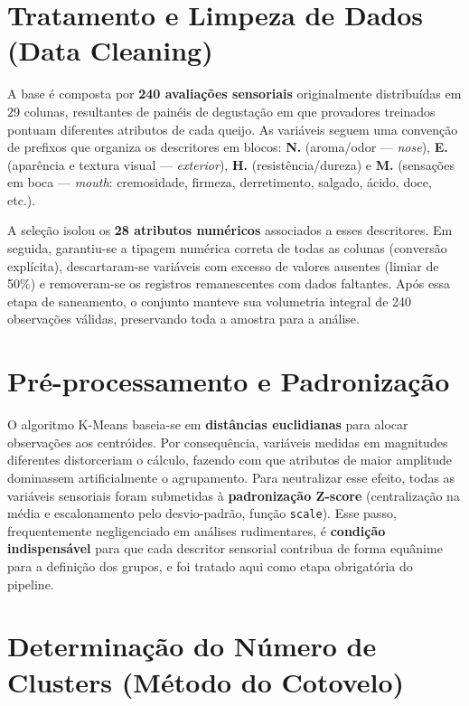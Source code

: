 \documentclass[11pt,a4paper]{article}
\begin{document}
\section{Tratamento e Limpeza de Dados (Data Cleaning)}

A base é composta por \textbf{240 avaliações sensoriais} originalmente distribuídas em 29 colunas, resultantes de painéis de degustação em que provadores treinados pontuam diferentes atributos de cada queijo. As variáveis seguem uma convenção de prefixos que organiza os descritores em blocos: \textbf{N.} (aroma/odor --- \textit{nose}), \textbf{E.} (aparência e textura visual --- \textit{exterior}), \textbf{H.} (resistência/dureza) e \textbf{M.} (sensações em boca --- \textit{mouth}: cremosidade, firmeza, derretimento, salgado, ácido, doce, etc.).

A seleção isolou os \textbf{28 atributos numéricos} associados a esses descritores. Em seguida, garantiu-se a tipagem numérica correta de todas as colunas (conversão explícita), descartaram-se variáveis com excesso de valores ausentes (limiar de 50\%) e removeram-se os registros remanescentes com dados faltantes. Após essa etapa de saneamento, o conjunto manteve sua volumetria integral de 240 observações válidas, preservando toda a amostra para a análise.

\section{Pré-processamento e Padronização}

O algoritmo K-Means baseia-se em \textbf{distâncias euclidianas} para alocar observações aos centróides. Por consequência, variáveis medidas em magnitudes diferentes distorceriam o cálculo, fazendo com que atributos de maior amplitude dominassem artificialmente o agrupamento. Para neutralizar esse efeito, todas as variáveis sensoriais foram submetidas à \textbf{padronização Z-score} (centralização na média e escalonamento pelo desvio-padrão, função \texttt{scale}). Esse passo, frequentemente negligenciado em análises rudimentares, é \textbf{condição indispensável} para que cada descritor sensorial contribua de forma equânime para a definição dos grupos, e foi tratado aqui como etapa obrigatória do pipeline.

\section{Determinação do Número de Clusters (Método do Cotovelo)}
\end{document}
